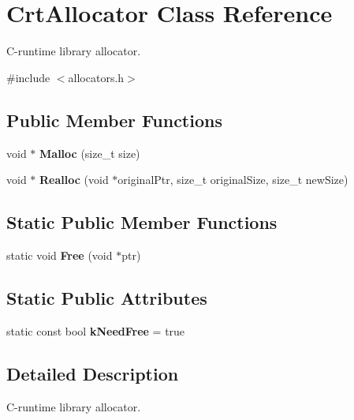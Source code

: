 \hypertarget{class_crt_allocator}{}\section{Crt\+Allocator Class Reference}
\label{class_crt_allocator}


C-\/runtime library allocator.  




{\ttfamily \#include $<$allocators.\+h$>$}

\subsection*{Public Member Functions}
\begin{DoxyCompactItemize}
\item 
\mbox{\label{class_crt_allocator_acd720631f8c094041afa6c7951f0d935}} 
void $\ast$ {\bfseries Malloc} (size\+\_\+t size)
\item 
\mbox{\label{class_crt_allocator_a646bb6f68afe773a62a22f7f14f83e97}} 
void $\ast$ {\bfseries Realloc} (void $\ast$original\+Ptr, size\+\_\+t original\+Size, size\+\_\+t new\+Size)
\end{DoxyCompactItemize}
\subsection*{Static Public Member Functions}
\begin{DoxyCompactItemize}
\item 
\mbox{\label{class_crt_allocator_a5043907058d906dcb1291e9491560373}} 
static void {\bfseries Free} (void $\ast$ptr)
\end{DoxyCompactItemize}
\subsection*{Static Public Attributes}
\begin{DoxyCompactItemize}
\item 
\mbox{\label{class_crt_allocator_ac7df8398c529290f0cd5950d9492f524}} 
static const bool {\bfseries k\+Need\+Free} = true
\end{DoxyCompactItemize}


\subsection{Detailed Description}
C-\/runtime library allocator. 

